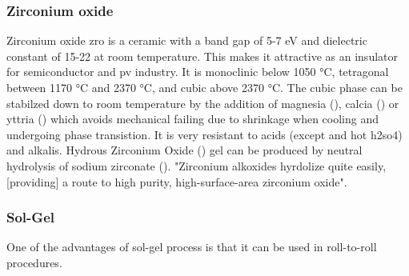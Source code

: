 \subsubsection{Zirconium oxide}
Zirconium oxide \gls{zro} is a ceramic with a band gap of 5-7 eV and dielectric constant of 15-22 at room temperature\cite{Anwar2017}. 
This makes it attractive as an insulator for semiconductor and \gls{pv} industry. 
It is monoclinic below 1050 °C, tetragonal between 1170 °C and 2370 °C, and cubic above 2370 °C\cite{Nielsen2005}.
The cubic phase can be stabilzed down to room temperature by the addition of magnesia (), calcia () or yttria () which avoids mechanical failing due to shrinkage 
when cooling and undergoing phase transistion\cite{Nielsen2005}.
It is very resistant to acids (except  and hot \gls{h2so4}) and alkalis\cite{Nielsen2005}.
Hydrous Zirconium Oxide () gel can be produced by neutral hydrolysis of sodium zirconate (). 
"Zirconium alkoxides hyrdolize quite easily, [providing] a route to high purity, high-surface-area zirconium oxide"\cite{Nielsen2005}.


\subsubsection{Sol-Gel}
One of the advantages of sol-gel process is that it can be used in roll-to-roll procedures.


